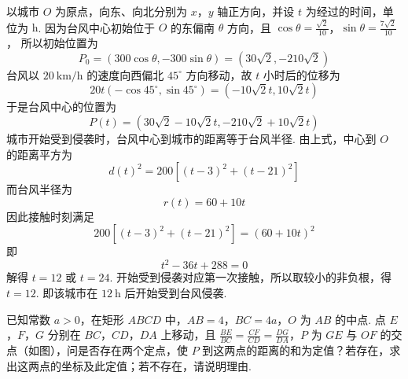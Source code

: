 \begin{solution}
以城市 \(O\) 为原点，向东、向北分别为 \(x\)，\(y\) 轴正方向，并设 \(t\) 为经过的时间，单位为 \(\mathrm h\). 因为台风中心初始位于 \(O\) 的东偏南 \(\theta\) 方向，且
\(\cos\theta=\frac{\sqrt2}{10}\)，\(\sin\theta=\frac{7\sqrt2}{10}\)，
所以初始位置为
\[
P_{0}=(300\cos\theta,-300\sin\theta)=(30\sqrt2,-210\sqrt2)
\]
台风以 \(20 \mathrm{~km}/\mathrm h\) 的速度向西偏北 \(45^{\circ}\) 方向移动，故 \(t\) 小时后的位移为
\[
20t\left(-\cos45^{\circ},\sin45^{\circ}\right)=(-10\sqrt2t,10\sqrt2t)
\]
于是台风中心的位置为
\[
P(t)=\left(30\sqrt2-10\sqrt2t,-210\sqrt2+10\sqrt2t\right)
\]
城市开始受到侵袭时，台风中心到城市的距离等于台风半径. 由上式，中心到 \(O\) 的距离平方为
\[
d(t)^{2}=200\left[(t-3)^{2}+(t-21)^{2}\right]
\]
而台风半径为
\[
r(t)=60+10t
\]
因此接触时刻满足
\[
200\left[(t-3)^{2}+(t-21)^{2}\right]=(60+10t)^{2}
\]
即
\[
t^{2}-36t+288=0
\]
解得 \(t=12\) 或 \(t=24\). 开始受到侵袭对应第一次接触，所以取较小的非负根，得 \(t=12\). 即该城市在 \(12 \mathrm{~h}\) 后开始受到台风侵袭.
\end{solution}

\begin{problem}
已知常数 \(a > 0\)，在矩形 \(ABCD\) 中，\(AB = 4\)，\(BC = 4a\)，\(O\) 为 \(AB\) 的中点. 点 \(E\)，\(F\)，\(G\) 分别在 \(BC\)，\(CD\)，\(DA\) 上移动，且 \(\frac{BE}{BC} = \frac{CF}{CD} = \frac{DG}{DA}\)，\(P\) 为 \(GE\) 与 \(OF\) 的交点（如图），问是否存在两个定点，使 \(P\) 到这两点的距离的和为定值？若存在，求出这两点的坐标及此定值；若不存在，请说明理由.

\end{problem}

